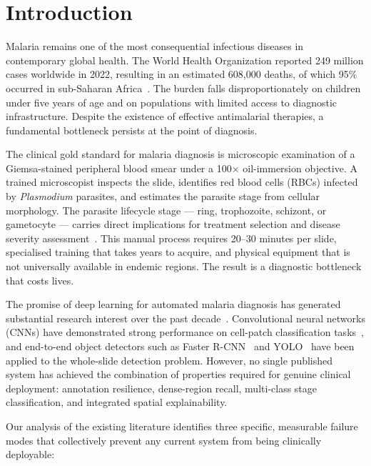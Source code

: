 \documentclass[review,12pt]{elsarticle}
\begin{document}
\section{Introduction}
\label{sec:intro}

Malaria remains one of the most consequential infectious diseases in
contemporary global health. The World Health Organization reported 249
million cases worldwide in 2022, resulting in an estimated 608,000 deaths,
of which 95\% occurred in sub-Saharan Africa~\cite{who2023}. The burden
falls disproportionately on children under five years of age and on
populations with limited access to diagnostic infrastructure. Despite the
existence of effective antimalarial therapies, a fundamental bottleneck
persists at the point of diagnosis.

The clinical gold standard for malaria diagnosis is microscopic examination
of a Giemsa-stained peripheral blood smear under a 100$\times$ oil-immersion
objective. A trained microscopist inspects the slide, identifies red blood
cells (RBCs) infected by \textit{Plasmodium} parasites, and estimates the
parasite stage from cellular morphology. The parasite lifecycle stage ---
ring, trophozoite, schizont, or gametocyte --- carries direct implications
for treatment selection and disease severity assessment~\cite{delves2012}.
This manual process requires 20--30 minutes per slide, specialised training
that takes years to acquire, and physical equipment that is not universally
available in endemic regions. The result is a diagnostic bottleneck that
costs lives.

The promise of deep learning for automated malaria diagnosis has generated
substantial research interest over the past decade~\cite{poostchi2018}.
Convolutional neural networks (CNNs) have demonstrated strong performance
on cell-patch classification tasks~\cite{rajaraman2019, singh2025}, and
end-to-end object detectors such as Faster R-CNN~\cite{ren2015} and
YOLO~\cite{yolov4malaria2024} have been applied to the whole-slide detection
problem. However, no single published system has achieved the combination
of properties required for genuine clinical deployment: annotation resilience,
dense-region recall, multi-class stage classification, and integrated
spatial explainability.

Our analysis of the existing literature identifies three specific, measurable
failure modes that collectively prevent any current system from being
clinically deployable:
\end{document}
